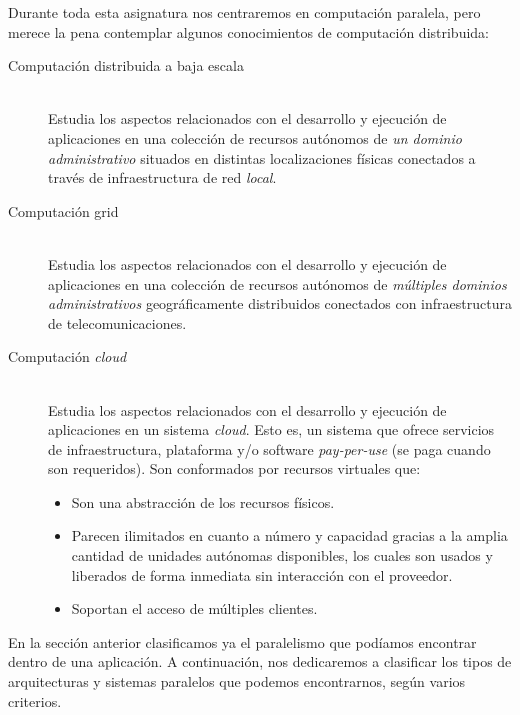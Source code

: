 Durante toda esta asignatura nos centraremos en computación paralela, pero merece la pena contemplar algunos conocimientos de computación distribuida:
\begin{description}
    \item [Computación distribuida a baja escala]~\\
        Estudia los aspectos relacionados con el desarrollo y ejecución de aplicaciones en una colección de recursos autónomos de \emph{un dominio administrativo} situados en distintas localizaciones físicas conectados a través de infraestructura de red \emph{local}.
    \item [Computación grid]~\\
        Estudia los aspectos relacionados con el desarrollo y ejecución de aplicaciones en una colección de recursos autónomos de \emph{múltiples dominios administrativos} geográficamente distribuidos conectados con infraestructura de telecomunicaciones.
    \item [Computación \textit{cloud}]~\\
        Estudia los aspectos relacionados con el desarrollo y ejecución de aplicaciones en un sistema \textit{cloud}. Esto es, un sistema que ofrece servicios de infraestructura, plataforma y/o software \textit{pay-per-use} (se paga cuando son requeridos). Son conformados por recursos virtuales que:
        \begin{itemize}
            \item Son una abstracción de los recursos físicos.
            \item Parecen ilimitados en cuanto a número y capacidad gracias a la amplia cantidad de unidades autónomas disponibles, los cuales son usados y liberados de forma inmediata sin interacción con el proveedor.
            \item Soportan el acceso de múltiples clientes.
        \end{itemize}
\end{description}

En la sección anterior clasificamos ya el paralelismo que podíamos encontrar dentro de una aplicación. A continuación, nos dedicaremos a clasificar los tipos de arquitecturas y sistemas paralelos que podemos encontrarnos, según varios criterios.

